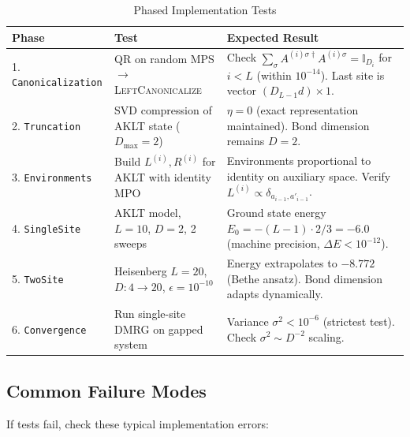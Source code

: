 \documentclass[aps,prb,onecolumn,scriptaddress]{revtex4-2}
\newcommand{\eps}{\epsilon}
\begin{document}
	\begin{table}[htbp]
		\centering
		\caption{Phased Implementation Tests}
		\label{tab:verification}
		\begin{tabularx}{\textwidth}{@{}l>{\raggedright\arraybackslash}p{3.5cm}X@{}}
			\toprule
			\textbf{Phase} & \textbf{Test} & \textbf{Expected Result} \\
			\midrule
			1. \texttt{Canonicalization} & 
			QR on random MPS $\to$ \textsc{LeftCanonicalize} & 
			Check $\sum_\sigma A^{(i)\sigma\dagger} A^{(i)\sigma} = \mathbb{I}_{D_i}$ for $i<L$ (within $10^{-14}$). Last site is vector $(D_{L-1}d) \times 1$. \\
			\midrule
			2. \texttt{Truncation} & 
			SVD compression of AKLT state ($D_{\max}=2$) & 
			$\eta = 0$ (exact representation maintained). Bond dimension remains $D=2$. \\
			\midrule
			3. \texttt{Environments} & 
			Build $L^{(i)}, R^{(i)}$ for AKLT with identity MPO & 
			Environments proportional to identity on auxiliary space. Verify $L^{(i)} \propto \delta_{a_{i-1},a'_{i-1}}$. \\
			\midrule
			4. \texttt{SingleSite} & 
			AKLT model, $L=10$, $D=2$, 2 sweeps & 
			Ground state energy $E_0 = -(L-1) \cdot 2/3 = -6.0$ (machine precision, $\Delta E < 10^{-12}$). \\
			\midrule
			5. \texttt{TwoSite} & 
			Heisenberg $L=20$, $D: 4\to20$, $\eps=10^{-10}$ & 
			Energy extrapolates to $-8.772$ (Bethe ansatz). Bond dimension adapts dynamically. \\
			\midrule
			6. \texttt{Convergence} & 
			Run single-site DMRG on gapped system & 
			Variance $\sigma^2 < 10^{-6}$ (strictest test). Check $\sigma^2 \sim D^{-2}$ scaling. \\
			\bottomrule
		\end{tabularx}
	\end{table}

	
	\subsection{Common Failure Modes}
	
	If tests fail, check these typical implementation errors:
	
\end{document}
